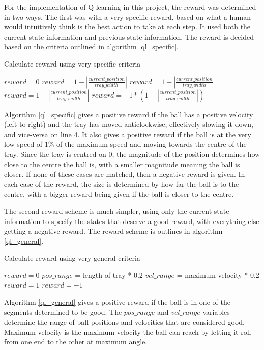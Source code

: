 \documentclass[12pt,a4paper]{article}
\begin{document}
For the implementation of Q-learning in this project, the reward was determined in two ways. The first was with a very specific reward, based on what a human would intuitively think is the best action to take at each step. It used both the current state information and previous state information. The reward is decided based on the criteria outlined in algorithm \ref{ql_specific}.
\begin{algorithm}[H]
	\caption{Calculate reward using very specific criteria}
	\label{ql_specific}
	\begin{algorithmic}[1]
		\State $reward = 0$
			\State $reward = 1 - |\frac{current\_position}{tray\_width}|$
			\State $reward = 1 - |\frac{current\_position}{tray\_width}|$
			\State $reward = 1 - |\frac{current\_position}{tray\_width}|$
		\Else 
			\State $reward = -1 * (1 -|\frac{current\_position}{tray\_width}|)$
		\EndIf
	\end{algorithmic}
\end{algorithm}
Algorithm \ref{ql_specific} gives a positive reward if the ball has a positive velocity (left to right) and the tray has moved anticlockwise, effectively slowing it down, and vice-versa on line 4. It also gives a positive reward if the ball is at the very low speed of 1\% of the maximum speed and moving towards the centre of the tray. Since the tray is centred on 0, the magnitude of the position determines how close to the centre the ball is, with a smaller magnitude meaning the ball is closer. If none of these cases are matched, then a negative reward is given. In each case of the reward, the size is determined by how far the ball is to the centre, with a bigger reward being given if the ball is closer to the centre.

The second reward scheme is much simpler, using only the current state information to specify the states that deserve a good reward, with everything else getting a negative reward. The reward scheme is outlines in algorithm \ref{ql_general}.

\begin{algorithm}[H]
	\caption{Calculate reward using very general criteria}
	\label{ql_general}
	\begin{algorithmic}[1]
		\State $reward = 0$
		\State$pos\_range$ = length of tray * 0.2
		\State$vel\_range$ = maximum velocity * 0.2
			\State $reward = 1$
		\Else 
			\State $reward = -1$
		\EndIf
	\end{algorithmic}
\end{algorithm}
Algorithm \ref{ql_general} gives a positive reward if the ball is in one of the segments determined to be good. The $pos\_range$ and $vel\_range$ variables determine the range of ball positions and velocities that are considered good. Maximum velocity is the maximum velocity the ball can reach by letting it roll from one end to the other at maximum angle.
\end{document}
